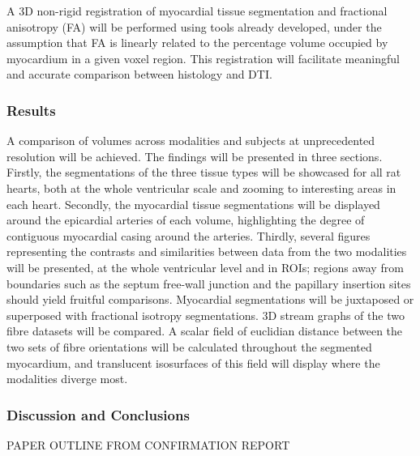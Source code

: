     A 3D non-rigid registration of myocardial tissue segmentation and fractional anisotropy (FA) will be performed using tools already developed, under the assumption that FA is linearly related to the percentage volume occupied by myocardium in a given voxel region. This registration will facilitate meaningful and accurate comparison between histology and DTI.
    
  \subsubsection{Results}
    A comparison of volumes across modalities and subjects at unprecedented resolution will be achieved. The findings will be presented in three sections. Firstly, the segmentations of the three tissue types will be showcased for all rat hearts, both at the whole ventricular scale and zooming to interesting areas in each heart. Secondly, the myocardial tissue segmentations will be displayed around the epicardial arteries of each volume, highlighting the degree of contiguous myocardial casing around the arteries. Thirdly, several figures representing the contrasts and similarities between data from the two modalities will be presented, at the whole ventricular level and in ROIs; regions away from boundaries such as the septum free-wall junction and the papillary insertion sites should yield fruitful comparisons. Myocardial segmentations will be juxtaposed or superposed with fractional isotropy segmentations. 3D stream graphs of the two fibre datasets will be compared. A scalar field of euclidian distance between the two sets of fibre orientations will be calculated throughout the segmented myocardium, and translucent isosurfaces of this field will display where the modalities diverge most.
    
  \subsubsection{Discussion and Conclusions}
PAPER OUTLINE FROM CONFIRMATION REPORT
